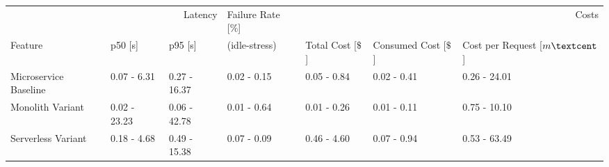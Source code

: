 \begin{tabular}{lllllll}
\toprule
 & \multicolumn{2}{r}{Latency} & Failure Rate [\%]  & \multicolumn{3}{r}{Costs} \\
Feature & p50 [s] & p95 [s] & (idle-stress) & Total Cost [$\$$] & Consumed Cost [$\$$] & Cost per Request [$m\textcent$] \\
\midrule
Microservice Baseline & 0.07 - 6.31 & 0.27 - 16.37 & 0.02 - 0.15 & 0.05 - 0.84 & 0.02 - 0.41 & 0.26 - 24.01 \\
Monolith Variant & 0.02 - 23.23 & 0.06 - 42.78 & 0.01 - 0.64 & 0.01 - 0.26 & 0.01 - 0.11 & 0.75 - 10.10 \\
Serverless Variant & 0.18 - 4.68 & 0.49 - 15.38 & 0.07 - 0.09 & 0.46 - 4.60 & 0.07 - 0.94 & 0.53 - 63.49 \\
\bottomrule
\end{tabular}
